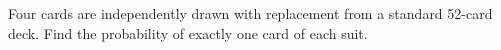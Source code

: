 Four cards are independently drawn with replacement from a standard 52-card deck. Find the probability of exactly one card of each suit.
